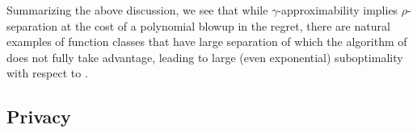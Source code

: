 Summarizing the above discussion, we see that while $\gamma$-approximability implies $\rho$-separation at the cost of a polynomial blowup in the regret, there are natural examples of function classes that have large separation of which the algorithm of \citet{wang2022adaptive} does not fully take advantage, leading to large (even exponential) suboptimality with respect to .









































\subsection{Privacy}\label{ssec:privacy}


